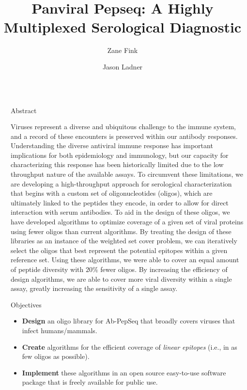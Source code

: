 \documentclass[final]{beamer}
\title{Panviral Pepseq: A Highly Multiplexed Serological Diagnostic}
\author{Zane Fink\inst{1} \and Jason Ladner\inst{1}}
\institute[shortinst]{\inst{1} The Pathogen and Microbiome Institute at Northern Arizona University}
\newlength{\sepwidth}
\newlength{\colwidth}
\newcommand{\separatorcolumn}{\begin{column}{\sepwidth}\end{column}}
\begin{document}
\begin{frame}[t]
\begin{columns}[t]
\separatorcolumn

\begin{column}{\colwidth}

  \begin{block}{Abstract}

Viruses represent a diverse and ubiquitous challenge to the immune system, and a record of these encounters is preserved within our antibody responses. 
Understanding the diverse antiviral immune response has important implications for both epidemiology and immunology, 
but our capacity for characterizing this response has been historically limited due to the low throughput nature of the available assays. 
To circumvent these limitations, we are developing a high-throughput approach for serological characterization that begins with a custom set of oligonucleotides (oligos),
which are ultimately linked to the peptides they encode, in order to allow for direct interaction with serum antibodies.
To aid in the design of these oligos, we have developed algorithms to optimize coverage of a given set of viral proteins using fewer oligos than current algorithms.
By treating the design of these libraries as an instance of the weighted set cover problem, 
we can iteratively select the oligos that best represent the potential epitopes within a given reference set. 
Using these algorithms, we were able to cover an equal amount of peptide diversity with $20\%$ fewer oligos. 
By increasing the efficiency of design algorithms, we are able to cover more viral diversity within a single assay, 
greatly increasing the sensitivity of a single assay.

\end{block}


\begin{alertblock}{Objectives}
  \begin{itemize}
  \item \textbf{Design} an oligo library for Ab-PepSeq that broadly
    covers viruses that infect humans/mammals.
  \item \textbf{Create} algorithms for the efficient coverage of
    \emph{linear epitopes} (i.e., in as few oligos as possible).
  \item \textbf{Implement} these algorithms in an open source
    easy-to-use software package that is freely available for public use.
  \end{itemize}
\end{alertblock}


\end{column}
\end{columns}
\end{frame}
\end{document}
